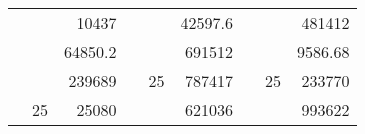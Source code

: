 \begin{table}[H]
\begin{tabular}{|ccrccrccc}
\rowcolor[HTML]{DAE8FC} 
\multicolumn{1}{|c|}{\cellcolor[HTML]{FFFFC7}}                                & \multicolumn{1}{c|}{\cellcolor[HTML]{DAE8FC}}                      & \multicolumn{1}{r|}{\cellcolor[HTML]{DAE8FC}10437}     & \multicolumn{1}{c|}{\cellcolor[HTML]{FFFFC7}}                                & \multicolumn{1}{c|}{\cellcolor[HTML]{DAE8FC}}                       & \multicolumn{1}{r|}{\cellcolor[HTML]{DAE8FC}42597.6}   & \multicolumn{1}{c|}{\cellcolor[HTML]{FFFFC7}}                                & \multicolumn{1}{c|}{\cellcolor[HTML]{DAE8FC}}                      & \multicolumn{1}{r|}{\cellcolor[HTML]{DAE8FC}481412}    \\ \cline{3-3} \cline{6-6} \cline{9-9} 
\multicolumn{1}{|c|}{\cellcolor[HTML]{FFFFC7}}                                & \multicolumn{1}{c|}{\cellcolor[HTML]{DAE8FC}}                      & \multicolumn{1}{r|}{\cellcolor[HTML]{DDFDFF}64850.2}   & \multicolumn{1}{c|}{\cellcolor[HTML]{FFFFC7}}                                & \multicolumn{1}{c|}{\cellcolor[HTML]{DAE8FC}}                       & \multicolumn{1}{r|}{\cellcolor[HTML]{DDFDFF}691512}    & \multicolumn{1}{c|}{\cellcolor[HTML]{FFFFC7}}                                & \multicolumn{1}{c|}{\cellcolor[HTML]{DAE8FC}}                      & \multicolumn{1}{r|}{\cellcolor[HTML]{DDFDFF}9586.68}   \\ \cline{3-3} \cline{6-6} \cline{9-9} 
\rowcolor[HTML]{DAE8FC} 
\multicolumn{1}{|c|}{\cellcolor[HTML]{FFFFC7}}                                & \multicolumn{1}{c|}{\cellcolor[HTML]{DAE8FC}}                      & \multicolumn{1}{r|}{\cellcolor[HTML]{DAE8FC}239689}    & \multicolumn{1}{c|}{\cellcolor[HTML]{FFFFC7}}                                & \multicolumn{1}{c|}{\multirow{-9}{*}{\cellcolor[HTML]{DAE8FC}25}}   & \multicolumn{1}{r|}{\cellcolor[HTML]{DAE8FC}787417}    & \multicolumn{1}{c|}{\cellcolor[HTML]{FFFFC7}}                                & \multicolumn{1}{c|}{\multirow{-9}{*}{\cellcolor[HTML]{DAE8FC}25}}  & \multicolumn{1}{r|}{\cellcolor[HTML]{DAE8FC}233770}    \\ \cline{3-3} \cline{5-6} \cline{8-9} 
\multicolumn{1}{|c|}{\cellcolor[HTML]{FFFFC7}}                                & \multicolumn{1}{c|}{\multirow{-10}{*}{\cellcolor[HTML]{DAE8FC}25}} & \multicolumn{1}{r|}{\cellcolor[HTML]{DDFDFF}25080}     & \multicolumn{1}{c|}{\cellcolor[HTML]{FFFFC7}}                                & \multicolumn{1}{c|}{\cellcolor[HTML]{DDFDFF}}                       & \multicolumn{1}{r|}{\cellcolor[HTML]{DAE8FC}621036}    & \multicolumn{1}{c|}{\cellcolor[HTML]{FFFFC7}}                                & \multicolumn{1}{c|}{\cellcolor[HTML]{DDFDFF}}                      & \multicolumn{1}{r|}{\cellcolor[HTML]{DAE8FC}993622}    \\ \cline{2-3} \cline{6-6} \cline{9-9} 

\end{tabular}
\end{table}
